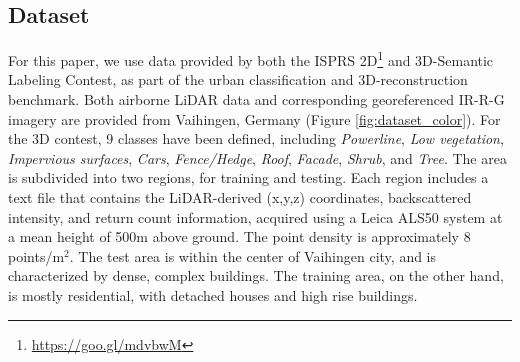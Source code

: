 \documentclass[final,3p,times,twocolumn,authoryear]{elsarticle}
\begin{document}
\subsection{Dataset}
\label{sec:dataset}
For this paper, we use data provided by both the ISPRS 2D\footnote{\url{https://goo.gl/mdvbwM}} and 3D-Semantic Labeling Contest, as part of the urban classification and 3D-reconstruction benchmark.
Both airborne LiDAR data and corresponding georeferenced IR-R-G imagery are provided from Vaihingen, Germany (Figure \ref{fig:dataset_color}).
For the 3D contest, 9 classes have been defined, including {\it Powerline}, {\it Low vegetation}, {\it Impervious surfaces}, {\it Cars}, {\it Fence/Hedge}, {\it Roof}, {\it Facade}, {\it Shrub}, and {\it Tree}. 
The area is subdivided into two regions, for training and testing. 
Each region includes a text file that contains the LiDAR-derived (x,y,z) coordinates, backscattered intensity, and return count information, acquired using a Leica ALS50 system at a mean height of 500m above ground. 
The point density is approximately 8 points/m$^{2}$. 
The test area is within the center of Vaihingen city, and is characterized by dense, complex buildings. 
The training area, on the other hand, is mostly residential, with detached houses and high rise buildings. 
\end{document}
